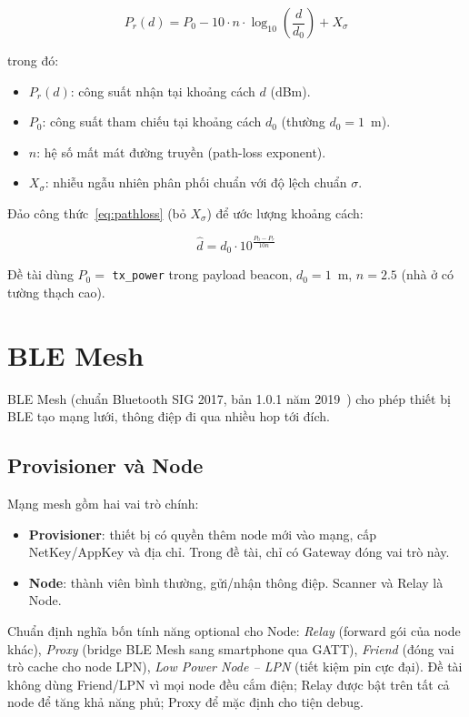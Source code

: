 \begin{equation}
    P_r(d) = P_0 - 10 \cdot n \cdot \log_{10}\left(\frac{d}{d_0}\right) + X_\sigma
    \label{eq:pathloss}
\end{equation}

trong đó:
\begin{itemize}
    \item $P_r(d)$: công suất nhận tại khoảng cách $d$ (dBm).
    \item $P_0$: công suất tham chiếu tại khoảng cách $d_0$ (thường $d_0 = 1$~m).
    \item $n$: hệ số mất mát đường truyền (path-loss exponent).
    \item $X_\sigma$: nhiễu ngẫu nhiên phân phối chuẩn với độ lệch chuẩn $\sigma$.
\end{itemize}

Đảo công thức~\eqref{eq:pathloss} (bỏ $X_\sigma$) để ước lượng khoảng cách:

\begin{equation}
    \hat{d} = d_0 \cdot 10^{\frac{P_0 - P_r}{10 n}}
    \label{eq:distance}
\end{equation}

Đề tài dùng $P_0 = $ \texttt{tx\_power} trong payload beacon, $d_0 = 1$~m, $n = 2.5$ (nhà ở có tường thạch cao).

\section{BLE Mesh}
\label{sec:ble-mesh}

BLE Mesh (chuẩn Bluetooth SIG 2017, bản 1.0.1 năm 2019~\cite{ble-mesh-spec}) cho phép thiết bị BLE tạo mạng lưới, thông điệp đi qua nhiều hop tới đích.

\subsection{Provisioner và Node}

Mạng mesh gồm hai vai trò chính:

\begin{itemize}
    \item \textbf{Provisioner}: thiết bị có quyền thêm node mới vào mạng, cấp NetKey/AppKey và địa chỉ. Trong đề tài, chỉ có Gateway đóng vai trò này.
    \item \textbf{Node}: thành viên bình thường, gửi/nhận thông điệp. Scanner và Relay là Node.
\end{itemize}

Chuẩn định nghĩa bốn tính năng optional cho Node: \textit{Relay} (forward gói của node khác), \textit{Proxy} (bridge BLE Mesh sang smartphone qua GATT), \textit{Friend} (đóng vai trò cache cho node LPN), \textit{Low Power Node -- LPN} (tiết kiệm pin cực đại). Đề tài không dùng Friend/LPN vì mọi node đều cắm điện; Relay được bật trên tất cả node để tăng khả năng phủ; Proxy để mặc định cho tiện debug.

